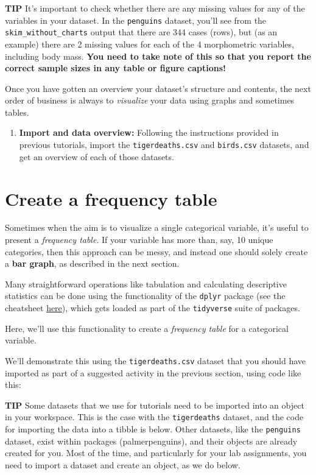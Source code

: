 \documentclass[
]{book}
\providecommand{\tightlist}{%
  \setlength{\itemsep}{0pt}\setlength{\parskip}{0pt}}
\begin{document}
\textbf{TIP}
It's important to check whether there are any missing values for any of the variables in your dataset. In the \texttt{penguins} dataset, you'll see from the \texttt{skim\_without\_charts} output that there are 344 cases (rows), but (as an example) there are 2 missing values for each of the 4 morphometric variables, including body mass. \textbf{You need to take note of this so that you report the correct sample sizes in any table or figure captions!}

Once you have gotten an overview your dataset's structure and contents, the next order of business is always to \emph{visualize} your data using graphs and sometimes tables.

\begin{enumerate}
\def\labelenumi{\arabic{enumi}.}
\tightlist
\item
  \textbf{Import and data overview:} Following the instructions provided in previous tutorials, import the \texttt{tigerdeaths.csv} and \texttt{birds.csv} datasets, and get an overview of each of those datasets.
\end{enumerate}

\section{Create a frequency table}\label{vis_cat_freq_table}

Sometimes when the aim is to visualize a single categorical variable, it's useful to present a \emph{frequency table}. If your variable has more than, say, 10 unique categories, then this approach can be messy, and instead one should solely create a \textbf{bar graph}, as described in the next section.

Many straightforward operations like tabulation and calculating descriptive statistics can be done using the functionality of the \texttt{dplyr} package (see the cheatsheet \href{https://github.com/rstudio/cheatsheets/raw/master/data-transformation.pdf}{here}), which gets loaded as part of the \texttt{tidyverse} suite of packages.

Here, we'll use this functionality to create a \emph{frequency table} for a categorical variable.

We'll demonstrate this using the \texttt{tigerdeaths.csv} dataset that you should have imported as part of a suggested activity in the previous section, using code like this:

\textbf{TIP}
Some datasets that we use for tutorials need to be imported into an object in your workspace. This is the case with the \texttt{tigerdeaths} dataset, and the code for importing the data into a tibble is below. Other datasets, like the \texttt{penguins} dataset, exist within packages (palmerpenguins), and their objects are already created for you. Most of the time, and particularly for your lab assignments, you need to import a dataset and create an object, as we do below.
\end{document}
